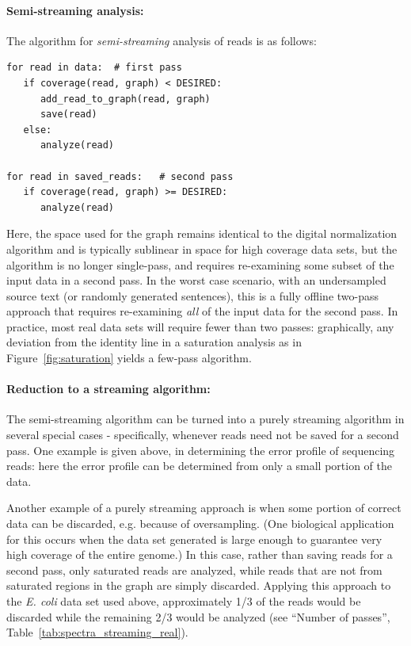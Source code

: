 \documentclass{article}
\begin{document}
\paragraph{Semi-streaming analysis:} The algorithm for {\em semi-streaming} analysis of reads is as
follows:
\begin{verbatim}
for read in data:  # first pass
   if coverage(read, graph) < DESIRED:
      add_read_to_graph(read, graph)
      save(read)
   else:
      analyze(read)

for read in saved_reads:   # second pass
   if coverage(read, graph) >= DESIRED:
      analyze(read)
\end{verbatim}
Here, the space used for the graph remains identical to the digital
normalization algorithm and is typically sublinear in space for high
coverage data sets, but the algorithm is no longer single-pass, and
requires re-examining some subset of the input data in a second pass.
In the worst case scenario, with an undersampled source text (or
randomly generated sentences), this is a fully offline two-pass
approach that requires re-examining {\em all} of the input data for
the second pass.  In practice, most real data sets will require fewer
than two passes: graphically, any deviation from the identity line in
a saturation analysis as in Figure~\ref{fig:saturation} yields a
few-pass algorithm.

\paragraph{Reduction to a streaming algorithm:} The semi-streaming
algorithm can be turned into a purely streaming algorithm in several
special cases - specifically, whenever reads need not be saved for a
second pass.  One example is given above, in determining the error
profile of sequencing reads: here the error profile can be determined
from only a small portion of the data.

Another example of a purely streaming approach is when some portion of
correct data can be discarded, e.g. because of oversampling.  (One
biological application for this occurs when the data set generated is
large enough to guarantee very high coverage of the entire genome.)
In this case, rather than saving reads
for a second pass, only saturated reads are analyzed, while reads that are not from saturated regions in the
graph are simply discarded.
Applying this approach to the {\em E. coli} data set used above,
approximately 1/3 of the reads would be discarded while the remaining
2/3 would be analyzed (see ``Number of passes'',
Table~\ref{tab:spectra_streaming_real}).
\end{document}
